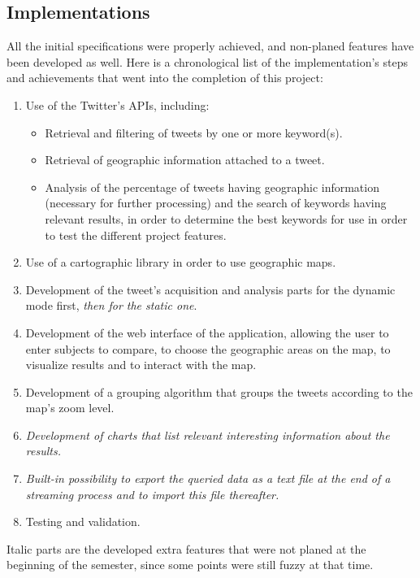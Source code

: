 \documentclass[a4paper,11pt]{report}
\begin{document}
\subsection{Implementations}
All the initial specifications were properly achieved, and non-planed features have been developed as well. Here is a chronological list of the implementation's steps and achievements that went into the completion of this project:
\begin{enumerate}
	\item Use of the Twitter's APIs, including:
	\begin{itemize}
		\item Retrieval and filtering of tweets by one or more keyword(s).
		\item Retrieval of geographic information attached to a tweet.
		\item Analysis of the percentage of tweets having geographic information (necessary for further processing) and the search of keywords having relevant results, in order to determine the best keywords for use in order to test the different project features.
	\end{itemize}
	\item Use of a cartographic library in order to use geographic maps.
	\item Development of the tweet's acquisition and analysis parts for the dynamic mode first, \textit{then for the static one}.
	\item Development of the web interface of the application, allowing the user to enter subjects to compare, to choose the geographic areas on the map, to visualize results and to interact with the map.
	\item Development of a grouping algorithm that groups the tweets according to the map's zoom level.
	\item \textit{Development of charts that list relevant interesting information about the results.}
	\item \textit{Built-in possibility to export the queried data as a text file at the end of a streaming process and to import this file thereafter.}
	\item Testing and validation.
\end{enumerate}

Italic parts are the developed extra features that were not planed at the beginning of the semester, since some points were still fuzzy at that time.\\
\end{document}
